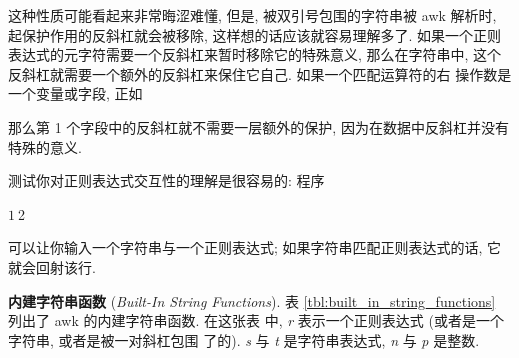这种性质可能看起来非常晦涩难懂, 但是, 被双引号包围的字符串被 awk 解析时,
起保护作用的反斜杠就会被移除, 这样想的话应该就容易理解多了. 如果一个正则
表达式的元字符需要一个反斜杠来暂时移除它的特殊意义, 那么在字符串中,
这个反斜杠就需要一个额外的反斜杠来保住它自己. 如果一个匹配运算符的右
操作数是一个变量或字段, 正如
那么第 1 个字段中的反斜杠就不需要一层额外的保护, 因为在数据中反斜杠并没有
特殊的意义.

测试你对正则表达式交互性的理解是很容易的: 程序
\begin{awkcode}
    $1 ~ $2
\end{awkcode}
可以让你输入一个字符串与一个正则表达式; 如果字符串匹配正则表达式的话, 它
就会回射该行.

\textbf{内建字符串函数} (\emph{Built-In String Functions}). 表
\ref{tbl:built_in_string_functions} 列出了 awk 的内建字符串函数. 在这张表
中, \textit{r} 表示一个正则表达式 (或者是一个字符串, 或者是被一对斜杠包围
了的). \textit{s} 与 \textit{t} 是字符串表达式, \textit{n} 与 \textit{p}
是整数.
